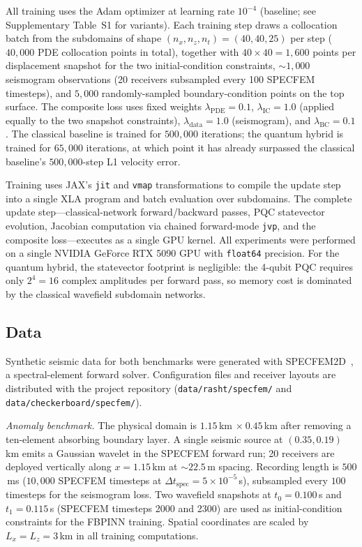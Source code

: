 All training uses the Adam optimizer at learning rate $10^{-4}$ (baseline; see Supplementary Table~S1 for variants). Each training step draws a collocation batch from the subdomains of shape $(n_x, n_z, n_t) = (40,40,25)$ per step ($40{,}000$ PDE collocation points in total), together with $40\!\times\!40 = 1{,}600$ points per displacement snapshot for the two initial-condition constraints, $\sim$$1{,}000$ seismogram observations (20 receivers subsampled every 100 SPECFEM timesteps), and $5{,}000$ randomly-sampled boundary-condition points on the top surface. The composite loss uses fixed weights $\lambda_\text{PDE} = 0.1$, $\lambda_\text{IC} = 1.0$ (applied equally to the two snapshot constraints), $\lambda_\text{data} = 1.0$ (seismogram), and $\lambda_\text{BC} = 0.1$. The classical baseline is trained for $500{,}000$ iterations; the quantum hybrid is trained for $65{,}000$ iterations, at which point it has already surpassed the classical baseline's $500{,}000$-step L1 velocity error.

Training uses JAX's \texttt{jit} and \texttt{vmap} transformations to compile the update step into a single XLA program and batch evaluation over subdomains. The complete update step---classical-network forward/backward passes, PQC statevector evolution, Jacobian computation via chained forward-mode \texttt{jvp}, and the composite loss---executes as a single GPU kernel. All experiments were performed on a single NVIDIA GeForce RTX 5090 GPU with \texttt{float64} precision. For the quantum hybrid, the statevector footprint is negligible: the 4-qubit PQC requires only $2^4 = 16$ complex amplitudes per forward pass, so memory cost is dominated by the classical wavefield subdomain networks.


\subsection{Data}
\label{sec:methods_data}

Synthetic seismic data for both benchmarks were generated with SPECFEM2D~, a spectral-element forward solver. Configuration files and receiver layouts are distributed with the project repository (\texttt{data/rasht/specfem/} and \texttt{data/checkerboard/specfem/}).

\textit{Anomaly benchmark.}
The physical domain is $1.15$\,km $\times\ 0.45$\,km after removing a ten-element absorbing boundary layer. A single seismic source at $(0.35, 0.19)$\,km emits a Gaussian wavelet in the SPECFEM forward run; 20 receivers are deployed vertically along $x = 1.15$\,km at $\sim$$22.5$\,m spacing. Recording length is $500$\,ms ($10{,}000$ SPECFEM timesteps at $\Delta t_\text{spec} = 5\times 10^{-5}$\,s), subsampled every $100$ timesteps for the seismogram loss. Two wavefield snapshots at $t_0 = 0.100$\,s and $t_1 = 0.115$\,s (SPECFEM timesteps 2000 and 2300) are used as initial-condition constraints for the FBPINN training. Spatial coordinates are scaled by $L_x = L_z = 3$\,km in all training computations.

